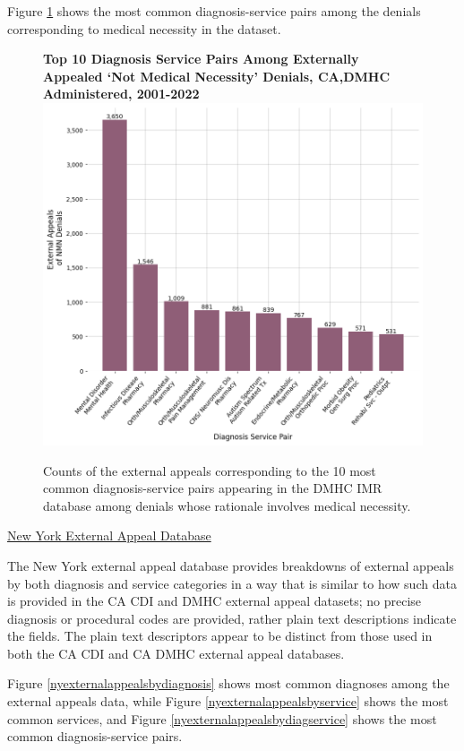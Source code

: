 \documentclass[12pt, a4paper,twoside]{report}
\theoremstyle{plain} %
\theoremstyle{definition} %
\theoremstyle{remark} %
\numberwithin{equation}{chapter}
\begin{document}
		
		Figure \ref{cadmhcnmnexternalappealdiagservice} shows the most common diagnosis-service pairs among the denials corresponding to medical necessity in the dataset.
		
		
		\begin{figure}[h!]
			\centering
			\textbf{Top 10 Diagnosis Service Pairs Among Externally Appealed `Not Medical Necessity' Denials, CA,DMHC Administered, 2001-2022}
			\includegraphics[width=.8\textwidth]{images/ca_dmhc_external_appeals/top_nmn_appeal_diag_service.png}
			\caption{Counts of the external appeals corresponding to the 10 most common diagnosis-service pairs appearing in the DMHC IMR database among denials whose rationale involves medical necessity.}
			\label{cadmhcnmnexternalappealdiagservice}
		\end{figure}
	
		\underline{New York External Appeal Database}
		
		The New York external appeal database provides breakdowns of external appeals by both diagnosis and service categories in a way that is similar to how such data is provided in the CA CDI and DMHC external appeal datasets; no precise diagnosis or procedural codes are provided, rather plain text descriptions indicate the fields. The plain text descriptors appear to be distinct from those used in both the CA CDI and CA DMHC external appeal databases.
		
		Figure \ref{nyexternalappealsbydiagnosis} shows most common diagnoses among the external appeals data, while Figure \ref{nyexternalappealsbyservice} shows the most common services, and Figure \ref{nyexternalappealsbydiagservice} shows the most common diagnosis-service pairs.
		
\end{document}
